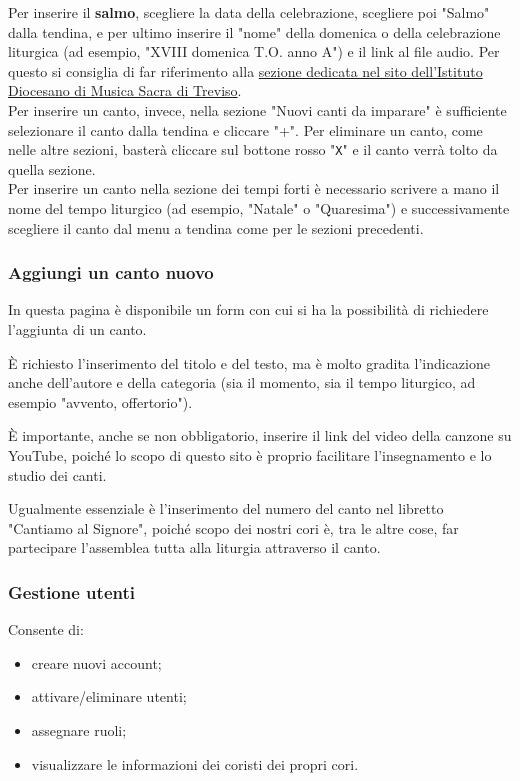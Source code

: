 \documentclass[a4paper,12pt]{article}
\begin{document}
	Per inserire il \textbf{salmo}, scegliere la data della celebrazione, scegliere poi "Salmo" dalla tendina, e per ultimo inserire il "nome" della domenica o della celebrazione liturgica (ad esempio, "XVIII domenica T.O. anno A") e il link al file audio. Per questo si consiglia di far riferimento alla  \href{https://www.istitutomusicasacratreviso.it/elenco-salmi/}{sezione dedicata nel sito dell'Istituto Diocesano di Musica Sacra di Treviso}.\\
	
	Per inserire un canto, invece, nella sezione "Nuovi canti da imparare" è sufficiente selezionare il canto dalla tendina e cliccare "+". Per eliminare un canto, come nelle altre sezioni, basterà cliccare sul bottone rosso "\texttt{X}" e il canto verrà tolto da quella sezione.\\
	
	Per inserire un canto nella sezione dei tempi forti è necessario scrivere a mano il nome del tempo liturgico (ad esempio, "Natale" o "Quaresima") e successivamente scegliere il canto dal menu a tendina come per le sezioni precedenti.
	
	\subsubsection{Aggiungi un canto nuovo}
	In questa pagina è disponibile un form con cui si ha la possibilità di richiedere l'aggiunta di un canto.
	
	È richiesto l'inserimento del titolo e del testo, ma è molto gradita l'indicazione anche dell'autore e della categoria (sia il momento, sia il tempo liturgico, ad esempio "avvento, offertorio").
	
	È importante, anche se non obbligatorio, inserire il link del video della canzone su YouTube, poiché lo scopo di questo sito è proprio facilitare l'insegnamento e lo studio dei canti.
	
	Ugualmente essenziale è l'inserimento del numero del canto nel libretto "Cantiamo al Signore", poiché scopo dei nostri cori è, tra le altre cose, far partecipare l'assemblea tutta alla liturgia attraverso il canto.
	
	\subsubsection{Gestione utenti}
	Consente di:
	\begin{itemize}
		\item creare nuovi account;
		\item attivare/eliminare utenti;
		\item assegnare ruoli;
		\item visualizzare le informazioni dei coristi dei propri cori.
	\end{itemize}
	
\end{document}
